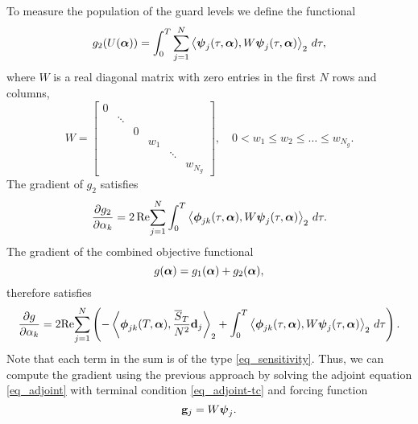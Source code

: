 \documentclass[11pt]{article}
\begin{document}
To measure the population of the guard levels we define the functional
\begin{equation}
  g_2(U(\boldsymbol{\alpha})) =\int_0^T \sum_{j=1}^N \left\langle \boldsymbol{\psi}_j(\tau,\boldsymbol{\alpha}), W\boldsymbol{\psi}_j(\tau,\boldsymbol{\alpha})
  \right\rangle_2\, d\tau,
\end{equation}
where $W$ is a real diagonal matrix with zero entries in the first $N$ rows and columns,
\[
W = \begin{bmatrix}
  0 &&&&& \\
  & \ddots &&&& \\
  && 0 &&& \\
  &&& w_1 && \\
  &&&& \ddots & \\
  &&&&& w_{N_g}
\end{bmatrix},\quad 0 < w_1 \leq w_2 \leq \ldots \leq w_{N_g}.
\]
The gradient of $g_2$ satisfies
\[
\frac{\partial g_2}{\partial \alpha_k} = 2\,{\rm Re}\! \sum_{j=1}^N  \int_0^T \left\langle \boldsymbol{\phi}_{jk}(\tau,\boldsymbol{\alpha}), W\boldsymbol{\psi}_j(\tau,\boldsymbol{\alpha})
\right\rangle_2\, d\tau.
\]
The gradient of the combined objective functional
\[
g(\boldsymbol{\alpha}) = g_1(\boldsymbol{\alpha}) + g_2(\boldsymbol{\alpha}),
\]
therefore satisfies
\[
\frac{\partial g}{\partial \alpha_k} = 2 {\rm Re}\! \sum_{j=1}^N \left(
%
-\left\langle\phib_{jk}(T,\alphab), \frac{\overline{S}_T}{N^2} \db_j \right\rangle_2 +
%
\int_0^T \left\langle \phib_{jk}(\tau,\alphab), W\psib_j(\tau,\alphab)\right\rangle_2\, d\tau \right).
\]
Note that each term in the sum is of the type \eqref{eq_sensitivity}. Thus, we can compute the
gradient using the previous approach by solving the adjoint equation \eqref{eq_adjoint} with
terminal condition \eqref{eq_adjoint-tc} and forcing function
\[
{\mathbf g}_j = W \boldsymbol{\psi}_j.
\]
  
\end{document}
